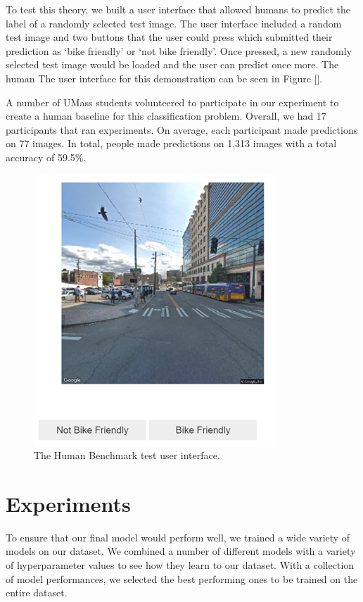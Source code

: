 \documentclass[10pt,twocolumn,letterpaper]{article}
\begin{document}
To test this theory, we built a user interface that allowed humans to predict the label of a randomly selected test image. The user interface included a random test image and two buttons that the user could press which submitted their prediction as ‘bike friendly’ or ‘not bike friendly’. Once pressed, a new randomly selected test image would be loaded and the user can predict once more. The human The user interface for this demonstration can be seen in Figure []. 

A number of UMass students volunteered to participate in our experiment to create a human baseline for this classification problem. Overall, we had 17 participants that ran experiments. On average, each participant made predictions on 77 images. In total, people made predictions on 1,313 images with a total accuracy of 59.5\%. 


\begin{figure}[t]
\begin{center}
	\includegraphics[width=.7\linewidth]{gui.png}
\end{center}
	\caption{The Human Benchmark test user interface.}
\label{fig:long}
\label{fig:onecol}
\end{figure}

\section{Experiments}
\label{sec:experiments}

To ensure that our final model would perform well, we trained a wide variety of models on our dataset. We combined a number of different models with a variety of hyperparameter values to see how they learn to our dataset. With a collection of model performances, we selected the best performing ones to be trained on the entire dataset.
\end{document}
